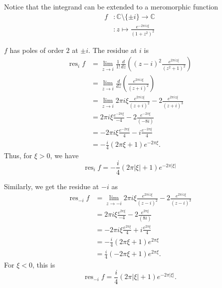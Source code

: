\documentclass[12 pt, letterpaper]{hmcpset}
\begin{document}
\begin{solution}
	Notice that the integrand can be extended to a meromorphic function
	\[
		\begin{split}
			f & :  \mathbb{C} \setminus \{ \pm i \} \to \mathbb{C} \\
			  & : z \mapsto \frac{e^{-2 \pi i z \xi}}{(1 + z^{2})^{2}}
		\end{split}
	\]

	$f$ has poles of order $2$ at $\pm i$. The residue at $i$ is
	\[
		\begin{split}
			\operatorname{res}_{i} f & = \lim_{z \to i} \frac{1}{1!} \frac{d}{dz} \left ( (z - i)^{2} \frac{e^{2 \pi i z \xi}}{(z^{2} + 1)^{2}} \right ) \\
											 & = \lim_{z \to i} \frac{d}{dz} \left ( \frac{e^{2 \pi i z \xi}}{(z + i)^{2}} \right ) \\
											 & = \lim_{z \to i} 2 \pi i \xi \frac{e^{2 \pi i z \xi}}{(z + i)^{2}} - 2 \frac{e^{2 \pi i z \xi}}{(z + i)^{3}} \\
											 & = 2 \pi i \xi \frac{e^{- 2 \pi \xi}}{-4} - 2 \frac{e^{-2 \pi \xi}}{(-8 i)} \\
											 & = - 2 \pi i \xi \frac{e^{- 2 \pi \xi}}{4} - i\frac{e^{- 2 \pi \xi}}{4} \\
											 & = - \frac{i}{4}(2 \pi \xi + 1) e^{- 2 \pi \xi}.
		\end{split}
	\]
	Thus, for $\xi > 0$, we have
	\[
		\operatorname{res}_{i} f = - \frac{i}{4} (2 \pi \lvert \xi \rvert + 1) e^{- 2 \pi \lvert \xi \rvert}
	\]

	Similarly, we get the residue at $-i$ as
	\[
		\begin{split}
			\operatorname{res}_{-i} f & = \lim_{z \to - i} 2 \pi i \xi \frac{e^{2 \pi i z \xi}}{(z - i)^{2}} - 2 \frac{e^{2 \pi i z \xi}}{(z - i)^{3}} \\
											  & = 2 \pi i \xi \frac{e^{2 \pi \xi}}{-4} - 2 \frac{e^{2 \pi \xi}}{(8 i)} \\
											  & = - 2 \pi i \xi \frac{e^{2 \pi \xi}}{4} + i\frac{e^{2 \pi \xi}}{4} \\
											  & = - \frac{i}{4}(2 \pi \xi + 1) e^{2 \pi \xi} \\
											  & = \frac{i}{4} (- 2 \pi \xi + 1) e^{2 \pi \xi}.
		\end{split}
	\]
	For $\xi < 0$, this is
	\[
		\operatorname{res}_{-i} f = \frac{i}{4} (2 \pi \lvert \xi \rvert + 1) e^{- 2 \pi \lvert \xi \rvert}.
	\]


\end{solution}
\end{document}
